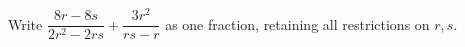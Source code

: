 Write $\dfrac{8r-8s}{2r^2-2rs}+\dfrac{3r^2}{rs-r}$ as one fraction, retaining all restrictions on $r,s$.
